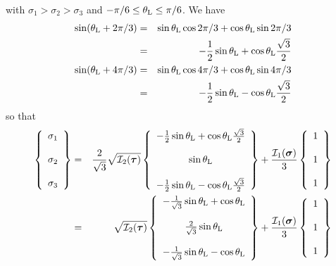 with $\sigma_1>\sigma_2>\sigma_3$ and $-\pi/6 \leq \theta_{\rm L} \leq \pi/6$. 
We have
\begin{eqnarray}
\sin (\theta_{\rm L} + 2\pi/3)  
&=& \sin \theta_{\rm L} \cos 2\pi/3 + \cos \theta_{\rm L} \sin 2\pi/3 \nonumber\\
&=& -\frac{1}{2}\sin \theta_{\rm L}  + \cos \theta_{\rm L} \frac{\sqrt{3}}{2} \\
\sin (\theta_{\rm L} + 4\pi/3)  
&=& \sin \theta_{\rm L} \cos 4\pi/3 + \cos \theta_{\rm L} \sin 4\pi/3  \nonumber\\
&=& -\frac{1}{2} \sin \theta_{\rm L} - \cos \theta_{\rm L} \frac{\sqrt{3}}{2} 
\end{eqnarray}
so that 
\begin{eqnarray}
\left\{
\begin{array}{c}
\sigma_1 \\ \\
\sigma_2 \\ \\
\sigma_3
\end{array}
\right\}
&=& \frac{2  }{\sqrt{3}}\sqrt{ {\cal I}_2({\bm \tau}) }
\left\{
\begin{array}{c}
-\frac{1}{2}\sin \theta_{\rm L}  + \cos \theta_{\rm L} \frac{\sqrt{3}}{2} \\ \\
\sin \theta_{\rm L}   \\ \\
-\frac{1}{2} \sin \theta_{\rm L} - \cos \theta_{\rm L} \frac{\sqrt{3}}{2} 
\end{array}
\right\}
+
\frac{{\cal I}_1({\bm \sigma})}{3}
\left\{
\begin{array}{c}
1 \\ \\
1 \\ \\
1
\end{array}
\right\} \\
&=& \sqrt{ {\cal I}_2({\bm \tau}) }
\left\{
\begin{array}{c}
-\frac{1}{\sqrt{3}}\sin \theta_{\rm L}  + \cos \theta_{\rm L} \\ \\
\frac{2}{\sqrt{3}} \sin \theta_{\rm L} \\ \\
-\frac{1}{\sqrt{3}}\sin \theta_{\rm L}  - \cos \theta_{\rm L} 
\end{array}
\right\}
+
\frac{{\cal I}_1({\bm \sigma})}{3}
\left\{
\begin{array}{c}
1 \\ \\
1 \\ \\
1
\end{array}
\right\}
\label{eq:sig123}
\end{eqnarray}





